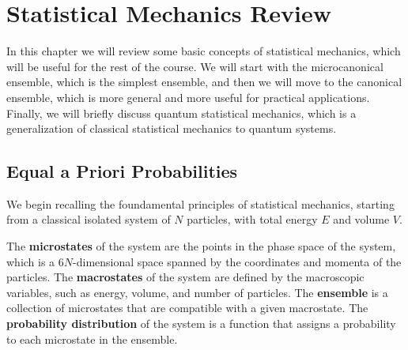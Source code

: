 \chapter{Statistical Mechanics Review}

In this chapter we will review some basic concepts of statistical mechanics, which will be useful for the rest of the course. We will start with the microcanonical ensemble, which is the simplest ensemble, and then we will move to the canonical ensemble, which is more general and more useful for practical applications. Finally, we will briefly discuss quantum statistical mechanics, which is a generalization of classical statistical mechanics to quantum systems.

\section{Equal a Priori Probabilities}

We begin recalling the foundamental principles of statistical mechanics, starting from a classical isolated system of \(N\) particles, with total energy \(E\) and volume \(V\).

The \textbf{microstates} of the system are the points in the phase space of the system, which is a \(6N\)-dimensional space spanned by the coordinates and momenta of the particles. The \textbf{macrostates} of the system are defined by the macroscopic variables, such as energy, volume, and number of particles. The \textbf{ensemble} is a collection of microstates that are compatible with a given macrostate. The \textbf{probability distribution} of the system is a function that assigns a probability to each microstate in the ensemble.

